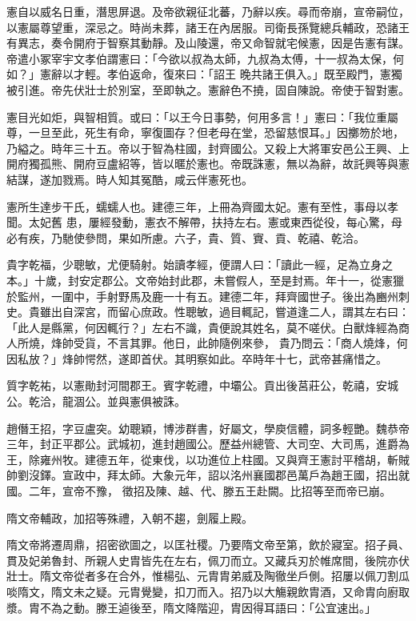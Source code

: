 \begin{pinyinscope}
 憲自以威名日重，潛思屏退。及帝欲親征北蕃，乃辭以疾。尋而帝崩，宣帝嗣位，以憲屬尊望重，深忌之。時尚未葬，諸王在內居服。司衛長孫覽總兵輔政，恐諸王有異志，奏令開府于智察其動靜。及山陵還，帝又命智就宅候憲，因是告憲有謀。帝遣小冢宰宇文孝伯謂憲曰：「今欲以叔為太師，九叔為太傅，十一叔為太保，何如？」憲辭以才輕。孝伯返命，復來曰：「詔王
 晚共諸王俱入。」既至殿門，憲獨被引進。帝先伏壯士於別室，至即執之。憲辭色不撓，固自陳說。帝使于智對憲。



 憲目光如炬，與智相質。或曰：「以王今日事勢，何用多言！」憲曰：「我位重屬尊，一旦至此，死生有命，寧復圖存？但老母在堂，恐留慈恨耳。」因擲笏於地，乃縊之。時年三十五。帝以于智為柱國，封齊國公。又殺上大將軍安邑公王興、上開府獨孤熊、開府豆盧紹等，皆以暱於憲也。帝既誅憲，無以為辭，故託興等與憲結謀，遂加戮焉。時人知其冤酷，咸云伴憲死也。



 憲所生達步干氏，蠕蠕人也。建德三年，上冊為齊國太妃。憲有至性，事母以孝聞。太妃舊
 患，屢經發動，憲衣不解帶，扶持左右。憲或東西從役，每心驚，母必有疾，乃馳使參問，果如所慮。六子，貴、質、賨、貢、乾禧、乾洽。



 貴字乾福，少聰敏，尤便騎射。始讀孝經，便謂人曰：「讀此一經，足為立身之本。」十歲，封安定郡公。文帝始封此郡，未嘗假人，至是封焉。年十一，從憲獵於監州，一圍中，手射野馬及鹿一十有五。建德二年，拜齊國世子。後出為豳州刺史。貴雖出自深宮，而留心庶政。性聰敏，過目輒記，嘗道逢二人，謂其左右曰：「此人是縣黨，何因輒行？」左右不識，貴便說其姓名，莫不嗟伏。白獸烽經為商人所燒，烽帥受貨，不言其罪。他日，此帥隨例來參，
 貴乃問云：「商人燒烽，何因私放？」烽帥愕然，遂即首伏。其明察如此。卒時年十七，武帝甚痛惜之。



 質字乾祐，以憲勛封河間郡王。賓字乾禮，中壩公。貢出後莒莊公，乾禧，安城公。乾洽，龍涸公。並與憲俱被誅。



 趙僭王招，字豆盧突。幼聰穎，博涉群書，好屬文，學庾信體，詞多輕艷。魏恭帝三年，封正平郡公。武城初，進封趙國公。歷益州總管、大司空、大司馬，進爵為王，除雍州牧。建德五年，從東伐，以功進位上柱國。又與齊王憲討平稽胡，斬賊帥劉沒鐸。宣政中，拜太師。大象元年，詔以洺州襄國郡邑萬戶為趙王國，招出就國。二年，宣帝不豫，
 徵招及陳、越、代、滕五王赴闕。比招等至而帝已崩。



 隋文帝輔政，加招等殊禮，入朝不趨，劍履上殿。



 隋文帝將遷周鼎，招密欲圖之，以匡社稷。乃要隋文帝至第，飲於寢室。招子員、貫及妃弟魯封、所親人史胄皆先在左右，佩刀而立。又藏兵刃於帷席間，後院亦伏壯士。隋文帝從者多在合外，惟楊弘、元胄胄弟威及陶徹坐戶側。招屢以佩刀割瓜啖隋文，隋文未之疑。元胄覺變，扣刀而入。招乃以大觴親飲胄酒，又命胄向廚取漿。胄不為之動。滕王逌後至，隋文降階迎，胄因得耳語曰：「公宜速出。」




\end{pinyinscope}
